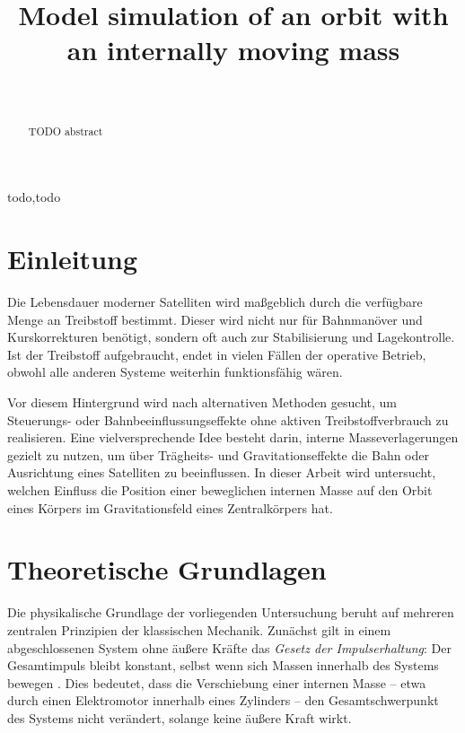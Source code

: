 \documentclass[conference]{IEEEtran}
\begin{document}
\title{Model simulation of an orbit with an internally moving mass\\
}

\author{
 \\
}

\maketitle

\begin{abstract}
    TODO abstract
\end{abstract}

\begin{IEEEkeywords}
    todo,todo
\end{IEEEkeywords}

\section{Einleitung}

Die Lebensdauer moderner Satelliten wird maßgeblich durch die verfügbare Menge an Treibstoff bestimmt. Dieser wird nicht nur für Bahnmanöver und Kurskorrekturen benötigt, sondern oft auch zur Stabilisierung und Lagekontrolle. Ist der Treibstoff aufgebraucht, endet in vielen Fällen der operative Betrieb, obwohl alle anderen Systeme weiterhin funktionsfähig wären.

Vor diesem Hintergrund wird nach alternativen Methoden gesucht, um Steuerungs- oder Bahnbeeinflussungseffekte ohne aktiven Treibstoffverbrauch zu realisieren. Eine vielversprechende Idee besteht darin, interne Masseverlagerungen gezielt zu nutzen, um über Trägheits- und Gravitationseffekte die Bahn oder Ausrichtung eines Satelliten zu beeinflussen. In dieser Arbeit wird untersucht, welchen Einfluss die Position einer beweglichen internen Masse auf den Orbit eines Körpers im Gravitationsfeld eines Zentralkörpers hat.

\section{Theoretische Grundlagen}

Die physikalische Grundlage der vorliegenden Untersuchung beruht auf mehreren zentralen Prinzipien der klassischen Mechanik. Zunächst gilt in einem abgeschlossenen System ohne äußere Kräfte das \textit{Gesetz der Impulserhaltung}: Der Gesamtimpuls bleibt konstant, selbst wenn sich Massen innerhalb des Systems bewegen \cite{goldstein}. Dies bedeutet, dass die Verschiebung einer internen Masse -- etwa durch einen Elektromotor innerhalb eines Zylinders -- den Gesamtschwerpunkt des Systems nicht verändert, solange keine äußere Kraft wirkt.
\end{document}
